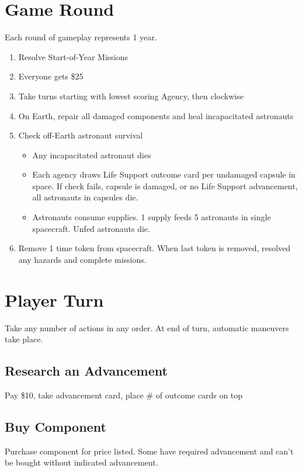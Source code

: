 \documentclass[12pt]{article}
\newenvironment{enumerateCustom}
{\begin{enumerate}
  \setlength{\itemsep}{1pt}
  \setlength{\parskip}{0pt}
  \setlength{\parsep}{0pt}}
{\end{enumerate}}
\newenvironment{itemizeCustom}
{\begin{itemize}
  \setlength{\itemsep}{1pt}
  \setlength{\parskip}{0pt}
  \setlength{\parsep}{0pt}}
{\end{itemize}}
\begin{document}
\begin{multicols*}{2}
\section*{Game Round}
Each round of gameplay represents 1 year.
\begin{enumerateCustom}
    \item Resolve Start-of-Year Missions
    \item Everyone gets \$25
    \item Take turns starting with lowest scoring Agency, then clockwise
    \item On Earth, repair all damaged components and heal incapacitated astronauts
    \item Check off-Earth astronaut survival
        \begin{itemizeCustom}
            \item Any incapacitated astronaut dies
            \item Each agency draws Life Support outcome card per undamaged capsule in space. If check fails, capsule is damaged, or no Life Support advancement, all astronauts in capsules die.
            \item Astronauts consume supplies. 1 supply feeds 5 astronauts in single spacecraft. Unfed astronauts die.
        \end{itemizeCustom}
    \item Remove 1 time token from spacecraft. When last token is removed, resolved any hazards and complete missions.
\end{enumerateCustom}

\section*{Player Turn}
Take any number of actions in any order. At end of turn, automatic maneuvers take place.

\subsection*{Research an Advancement}
Pay \$10, take advancement card, place \# of outcome cards on top

\subsection*{Buy Component}
Purchase component for price listed. Some have required advancement and can't be bought without indicated advancement.


\end{multicols*}
\end{document}

